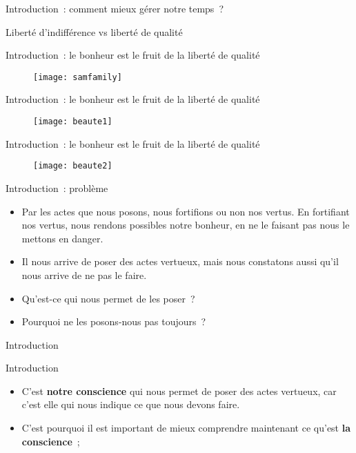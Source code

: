 \documentclass[11pt,xcolor=dvipsname,ignorenonframetext,handout]{beamer}
\begin{document}
\begin{frame}{Introduction~: comment mieux gérer notre temps~?}
\begin{frame}{Liberté d'indifférence vs liberté de qualité}
{          }    
\end{frame}
\begin{frame}{Introduction~: le bonheur est le fruit de la liberté de qualité}
    {
        \begin{figure}
          \centering
          \texttt{[image: samfamily]}
        \end{figure}
          }    
\end{frame}
\begin{frame}{Introduction~: le bonheur est le fruit de la liberté de qualité}
    {
        \begin{figure}
          \centering
          \texttt{[image: beaute1]}
        \end{figure}
          }    
\end{frame}
\begin{frame}{Introduction~: le bonheur est le fruit de la liberté de qualité}
    {
        \begin{figure}
          \centering
          \texttt{[image: beaute2]}
        \end{figure}
          }    
\end{frame}
\begin{frame}{Introduction~: problème}
    \begin{itemize}
        \rightskip=0pt\leftskip=0pt
        \item Par les actes que nous posons, nous fortifions ou non nos vertus. En fortifiant nos vertus, nous rendons possibles notre bonheur, en ne le faisant pas nous le mettons en danger.
        \item Il nous arrive de poser des actes vertueux, mais nous constatons aussi qu'il nous arrive de ne pas le faire.
        \item Qu'est-ce qui nous permet de les poser~?
        \item Pourquoi ne les posons-nous pas toujours~?
    \end{itemize}
\end{frame}{Introduction}
\begin{frame}{Introduction}
    \begin{itemize}
        \rightskip=0pt\leftskip=0pt
        \item C'est \textbf{notre conscience} qui nous permet de poser des actes vertueux, car c'est elle qui nous indique ce que nous devons faire.
        \item C'est pourquoi il est important de mieux comprendre maintenant ce qu'est \textbf{la conscience}~;

\end{itemize}
\end{frame}
\end{frame}
\end{document}
